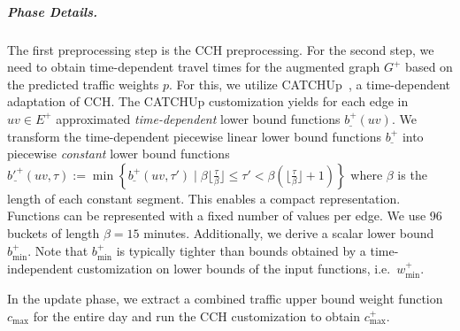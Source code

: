\documentclass[a4paper,UKenglish,cleveref, autoref, thm-restate,anonymous]{lipics-v2021}
\newcommand*{\comb}{c}
\newcommand*{\pcfn}{\underline{b'^+}}
\newcommand*{\bucketlen}{\beta}
\begin{document}
\subparagraph{Phase Details.}
The first preprocessing step is the CCH preprocessing.
For the second step, we need to obtain time-dependent travel times for the augmented graph $G^+$ based on the predicted traffic weights $p$.
For this, we utilize CATCHUp~\cite{swz-sfert-21}, a time-dependent adaptation of CCH.
The CATCHUp customization yields for each edge in $uv \in E^+$ approximated \emph{time-dependent} lower bound functions $\underline{b^+}(uv)$.
We transform the time-dependent piecewise linear lower bound functions $\underline{b^+}$ into piecewise \emph{constant} lower bound functions
$\pcfn(uv, \tau) := \min \left\{ \underline{b^+}(uv, \tau') \mid \bucketlen  \lfloor \frac{\tau}{\bucketlen} \rfloor \leq \tau' < \bucketlen (\lfloor \frac{\tau}{\bucketlen} \rfloor + 1) \right\}$
where $\bucketlen$ is the length of each constant segment.
This enables a compact representation.
Functions can be represented with a fixed number of values per edge.
We use 96 buckets of length $\bucketlen = 15$ minutes.
Additionally, we derive a scalar lower bound $b^+_{\min}$.
Note that $b^+_{\min}$ is typically tighter than bounds obtained by a time-independent customization on lower bounds of the input functions, i.e.\ $w^+_{\min}$.

In the update phase, we extract a combined traffic upper bound weight function $\comb_{\max}$ for the entire day and run the CCH customization to obtain $\comb^+_{\max}$.
\end{document}
